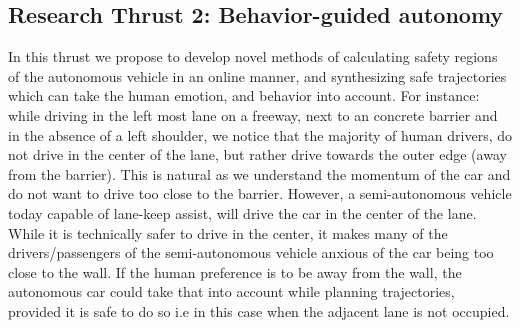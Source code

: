 
\subsection{Research Thrust 2: Behavior-guided autonomy}
\label{sec:reachability}




In this thrust we propose to develop novel methods of calculating safety regions of the autonomous vehicle in an online manner, and synthesizing safe trajectories which can take the human emotion, and behavior into account. 
For instance: while driving in the left most lane on a freeway, next to an concrete barrier and in the absence of a left shoulder, we notice that the majority of human drivers, do not drive in the center of the lane, but rather drive towards the outer edge (away from the barrier). This is natural as we understand the momentum of the car and do not want to drive too close to the barrier. However, a semi-autonomous vehicle today capable of lane-keep assist, will drive the car in the center of the lane. While it is technically safer to drive in the center, it makes many of the drivers/passengers of the semi-autonomous vehicle anxious of the car being too close to the wall. If the human preference is to be away from the wall, the autonomous car could take that into account while planning trajectories, provided it is safe to do so i.e in this case when the adjacent lane is not occupied. 

